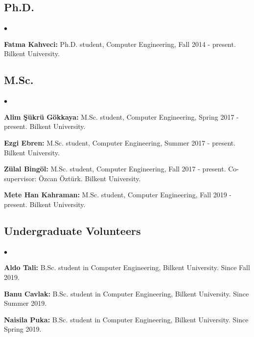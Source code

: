 \documentclass[margin,line]{res}
\newenvironment{list2}{
  \begin{list}{$\bullet$}{%
      \setlength{\itemsep}{0.1cm}
      \setlength{\parsep}{0in} \setlength{\parskip}{0in}
      \setlength{\topsep}{0in} \setlength{\partopsep}{0in} 
      \setlength{\leftmargin}{0.2in}}}{\end{list}}
\begin{document}
\begin{resume}
\subsection{\small \sc Ph.D.}
\begin{list2}
\item
  {\bf Fatma Kahveci:} Ph.D. student, Computer Engineering, Fall 2014 - present.
  Bilkent University.
\end{list2}
\vspace*{-.4cm}
\subsection{\small \sc M.Sc.}
\begin{list2}
\item
  {\bf Alim Şükrü Gökkaya:} M.Sc. student, Computer Engineering, Spring 2017 - present.
  Bilkent University. 
\item
  {\bf Ezgi Ebren:} M.Sc. student, Computer Engineering, Summer 2017 - present.
  Bilkent University. 
\item
  {\bf Zülal Bingöl:} M.Sc. student, Computer Engineering, Fall 2017 - present. Co-supervisor: Özcan Öztürk.
  Bilkent University.
\item
  {\bf Mete Han Kahraman:} M.Sc. student, Computer Engineering, Fall 2019 - present. 
  Bilkent University. 
\end{list2}

\vspace*{-.4cm}
  \subsection{\small \sc Undergraduate Volunteers}
  \begin{list2}
  \item {\bf Aldo Tali:} B.Sc. student in Computer Engineering,  Bilkent University. Since Fall 2019.
\item {\bf Banu Cavlak:} B.Sc. student in Computer Engineering,  Bilkent University. Since Summer 2019.
\item {\bf Naisila Puka:} B.Sc. student in Computer Engineering,  Bilkent University. Since Spring 2019.
    \end{list2}



\end{resume}
\end{document}
